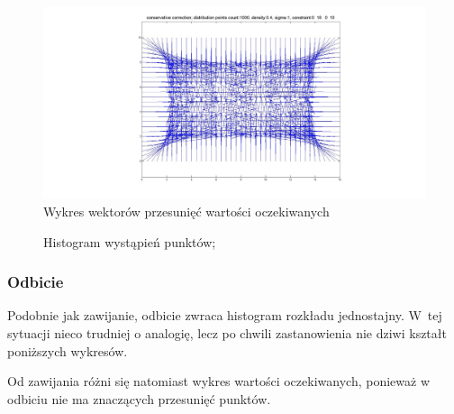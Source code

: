 \documentclass{mini}
\begin{document}
\begin{figure}[H]
\centering
\includegraphics[width=\textwidth]{wrapping2dprzesuniecie}
\caption{Wykres wektorów przesunięć wartości oczekiwanych}
\end{figure}

\begin{figure}[H]
\centering
{}
\quad
{}
\caption{Histogram wystąpień punktów;}
\end{figure}

\subsubsection*{Odbicie}
Podobnie jak zawijanie, odbicie zwraca histogram rozkładu jednostajny. W~tej sytuacji nieco trudniej o analogię, lecz po chwili zastanowienia nie dziwi kształt poniższych wykresów.

Od zawijania różni się natomiast wykres wartości oczekiwanych, ponieważ w odbiciu nie ma znaczących przesunięć punktów.
\end{document}
